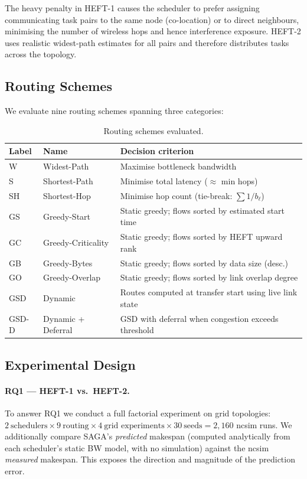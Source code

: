 \documentclass[11pt]{article}
\begin{document}
The heavy penalty in HEFT-1 causes the scheduler to prefer assigning
communicating task pairs to the same node (co-location) or to direct neighbours,
minimising the number of wireless hops and hence interference exposure.
HEFT-2 uses realistic widest-path estimates for all pairs and therefore
distributes tasks across the topology.

\subsection{Routing Schemes}
\label{sec:routing}

We evaluate nine routing schemes spanning three categories:

\begin{table}[H]
\centering
\small
\begin{tabular}{lll}
\toprule
\textbf{Label} & \textbf{Name} & \textbf{Decision criterion} \\
\midrule
W     & Widest-Path          & Maximise bottleneck bandwidth \\
S     & Shortest-Path        & Minimise total latency ($\approx$ min hops) \\
SH    & Shortest-Hop         & Minimise hop count (tie-break: $\sum 1/b_\ell$) \\
GS    & Greedy-Start         & Static greedy; flows sorted by estimated start time \\
GC    & Greedy-Criticality   & Static greedy; flows sorted by HEFT upward rank \\
GB    & Greedy-Bytes         & Static greedy; flows sorted by data size (desc.) \\
GO    & Greedy-Overlap       & Static greedy; flows sorted by link overlap degree \\
GSD   & Dynamic              & Routes computed at transfer start using live link state \\
GSD-D & Dynamic + Deferral   & GSD with deferral when congestion exceeds threshold \\
\bottomrule
\end{tabular}
\caption{Routing schemes evaluated.}
\label{tab:routing}
\end{table}

\subsection{Experimental Design}
\label{sec:design}

\paragraph{RQ1 --- HEFT-1 vs.\ HEFT-2.}
To answer RQ1 we conduct a full factorial experiment on grid topologies:
$2\ \text{schedulers} \times 9\ \text{routing} \times 4\ \text{grid experiments}
\times 30\ \text{seeds} = 2{,}160$ ncsim runs.
We additionally compare SAGA's \emph{predicted} makespan (computed analytically
from each scheduler's static BW model, with no simulation) against the ncsim
\emph{measured} makespan.  This exposes the direction and magnitude of the
prediction error.
\end{document}
